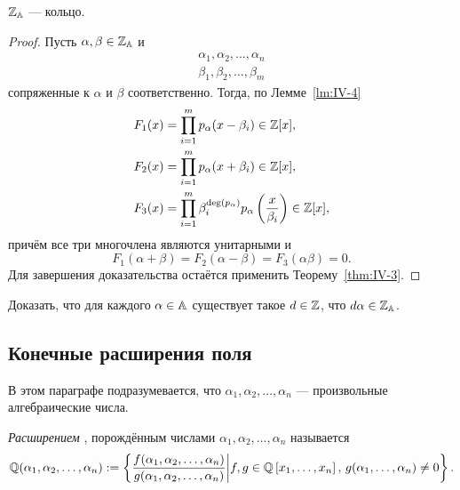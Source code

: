 \begin{ntheorem}
\label{thm:IV-4}
    $\ZZ_\AA$ --- кольцо.
\end{ntheorem}
\begin{proof}
    Пусть $\alpha, \beta \in \ZZ_\AA$ и 
    \begin{align*}
        \alpha_1, \alpha_2, \dots, \alpha_n \\
        \beta_1, \beta_2, \dots, \beta_m
    \end{align*}
    сопряженные к $\alpha$ и $\beta$ соответственно.
    Тогда, по Лемме~\ref{lm:IV-4}
    \begin{align*}
        F_1(x) &= \prod_{i=1}^{m} p_{\alpha}(x - \beta_i) \in \ZZ[x], \\
        F_2(x) &= \prod_{i=1}^{m} p_{\alpha}(x + \beta_i) \in \ZZ[x], \\
        F_3(x) &= \prod_{i=1}^{m} \beta_i^{\deg{p_{\alpha}}} p_{\alpha}\left( \frac{x}{\beta_i} \right) \in \ZZ[x],
    \end{align*}
    причём все три многочлена являются унитарными и
    \[
        F_1(\alpha + \beta) = F_2(\alpha - \beta) = F_3(\alpha\beta) = 0.
    \]
    Для завершения доказательства остаётся применить Теорему~\ref{thm:IV-3}.
\end{proof}

\begin{nproblem}
\label{prb:IV-1}
    Доказать, что для каждого $\alpha \in \AA$ существует такое $d \in \ZZ$, что $d\alpha \in \ZZ_\AA$.
\end{nproblem}


\subsection{\texorpdfstring{Конечные расширения поля \QQ}{Конечные расширения поля Q}}
\label{subsec:IV-3}

\begin{remark}
    В этом параграфе подразумевается, что $\alpha_1, \alpha_2, \dots, \alpha_n$ --- произвольные алгебраические числа.
\end{remark}

\begin{ndefinition}
\label{def:IV-extension}
    \emph{Расширением} \QQ, порождённым числами $\alpha_1, \alpha_2, \dots, \alpha_n$ называется
    \[
        \QQ(\alpha_1, \alpha_2, \dots, \alpha_n) := 
        \left\{ 
          \frac{f(\alpha_1, \alpha_2, \dots, \alpha_n)}{g(\alpha_1, \alpha_2, \dots, \alpha_n)} 
        \bigg| 
          f, g \in \QQ\left[ x_1, \dots, x_n \right],\, 
          g(\alpha_1, \dots, \alpha_n) \ne 0 
        \right\}.
    \]
\end{ndefinition}

